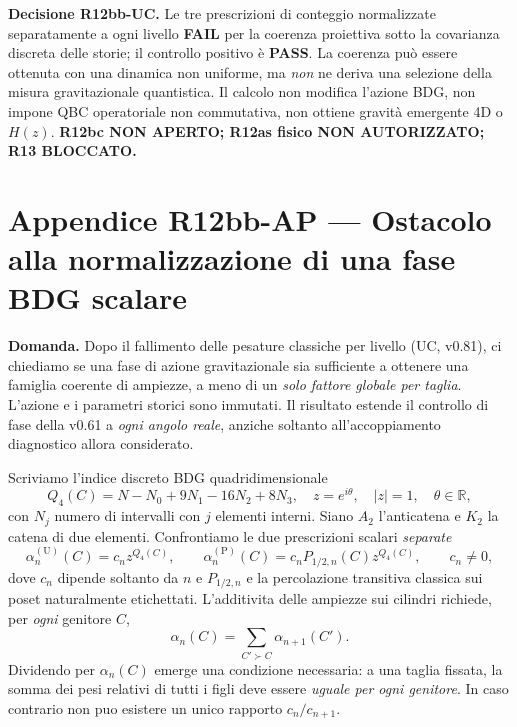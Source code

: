 \documentclass[11pt,a4paper]{article}
\begin{document}
\textbf{Decisione R12bb-UC.} Le tre prescrizioni di conteggio normalizzate separatamente a ogni livello \textbf{FAIL} per la coerenza proiettiva sotto la covarianza discreta delle storie; il controllo positivo \`e \textbf{PASS}. La coerenza pu\`o essere ottenuta con una dinamica non uniforme, ma \emph{non} ne deriva una selezione della misura gravitazionale quantistica. Il calcolo non modifica l'azione BDG, non impone QBC operatoriale non commutativa, non ottiene gravit\`a emergente 4D o $H(z)$. \textbf{R12bc NON APERTO; R12as fisico NON AUTORIZZATO; R13 BLOCCATO.}

\clearpage
\section*{Appendice R12bb-AP --- Ostacolo alla normalizzazione di una fase BDG scalare}
\textbf{Domanda.} Dopo il fallimento delle pesature classiche per livello (UC, v0.81), ci chiediamo se una fase di azione gravitazionale sia sufficiente a ottenere una famiglia coerente di ampiezze, a meno di un \emph{solo fattore globale per taglia}. L'azione e i parametri storici sono immutati. Il risultato estende il controllo di fase della v0.61 a \emph{ogni angolo reale}, anziche soltanto all'accoppiamento diagnostico allora considerato.

Scriviamo l'indice discreto BDG quadridimensionale
\begin{equation}
 Q_4(C)=N-N_0+9N_1-16N_2+8N_3,\quad z=e^{i\theta},\quad |z|=1,\quad \theta\in\mathbb R,\tag{AP.1}
\end{equation}
con $N_j$ numero di intervalli con $j$ elementi interni. Siano $A_2$ l'anticatena e $K_2$ la catena di due elementi. Confrontiamo le due prescrizioni scalari \emph{separate}
\begin{equation}
 \alpha_n^{(\mathrm U)}(C)=c_nz^{Q_4(C)},\qquad
 \alpha_n^{(\mathrm P)}(C)=c_n P_{1/2,n}(C)z^{Q_4(C)},\qquad c_n\ne0,\tag{AP.2}
\end{equation}
dove $c_n$ dipende soltanto da $n$ e $P_{1/2,n}$ e la percolazione transitiva classica sui poset naturalmente etichettati. L'additivita delle ampiezze sui cilindri richiede, per \emph{ogni} genitore $C$,
\begin{equation}
 \alpha_n(C)=\sum_{C'\succ C}\alpha_{n+1}(C').\tag{AP.3}
\end{equation}
Dividendo per $\alpha_n(C)$ emerge una condizione necessaria: a una taglia fissata, la somma dei pesi relativi di tutti i figli deve essere \emph{uguale per ogni genitore}. In caso contrario non puo esistere un unico rapporto $c_n/c_{n+1}$.
\end{document}
